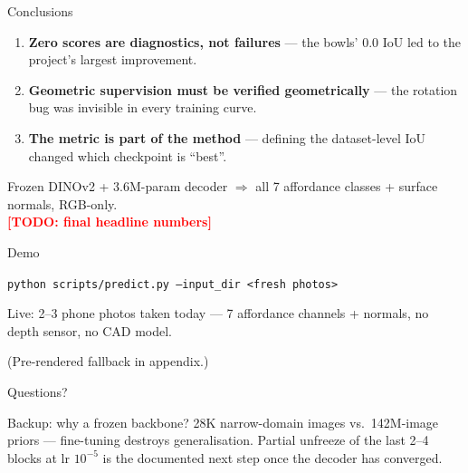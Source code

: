 \documentclass[aspectratio=169,10pt]{beamer}
\newcommand{\todo}[1]{\textcolor{red}{\textbf{[TODO: #1]}}}
\begin{document}
\begin{frame}{Conclusions}
  \begin{enumerate}
    \item \textbf{Zero scores are diagnostics, not failures} --- the bowls'
          0.0 IoU led to the project's largest improvement.
    \item \textbf{Geometric supervision must be verified geometrically} ---
          the rotation bug was invisible in every training curve.
    \item \textbf{The metric is part of the method} --- defining the
          dataset-level IoU changed which checkpoint is ``best''.
  \end{enumerate}
  \bigskip
  \begin{center}
    Frozen DINOv2 + 3.6M-param decoder $\Rightarrow$ all 7 affordance classes
    + surface normals, RGB-only.\\
    \medskip
    \todo{final headline numbers}
  \end{center}
\end{frame}

\begin{frame}{Demo}
  \begin{center}
    {\Large \texttt{python scripts/predict.py --input\_dir <fresh photos>}}
    \bigskip

    Live: 2--3 phone photos taken today --- 7 affordance channels + normals,
    no depth sensor, no CAD model.
    \bigskip

    {\small (Pre-rendered fallback in appendix.)}
  \end{center}
\end{frame}

\begin{frame}[standout]
  Questions?
\end{frame}

\appendix

\begin{frame}{Backup: why a frozen backbone?}
  28K narrow-domain images vs.\ 142M-image priors --- fine-tuning destroys
  generalisation. Partial unfreeze of the last 2--4 blocks at lr $10^{-5}$
  is the documented next step once the decoder has converged.
\end{frame}
\end{document}
